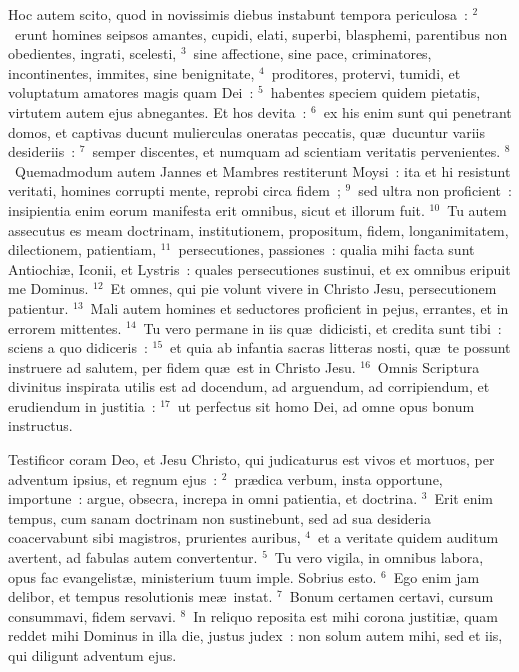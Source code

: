 \lettrine[lines=10,image=true,loversize=0.05,lraise=-0.03]{H}{}oc autem scito, quod in novissimis diebus instabunt tempora periculosa~:
${}^{2}$~erunt homines seipsos amantes, cupidi, elati, superbi, blasphemi, parentibus non obedientes, ingrati, scelesti,
${}^{3}$~sine affectione, sine pace, criminatores, incontinentes, immites, sine benignitate,
${}^{4}$~proditores, protervi, tumidi, et voluptatum amatores magis quam Dei~:
${}^{5}$~habentes speciem quidem pietatis, virtutem autem ejus abnegantes. Et hos devita~:
${}^{6}$~ex his enim sunt qui penetrant domos, et captivas ducunt mulierculas oneratas peccatis, qu\ae\ ducuntur variis desideriis~:
${}^{7}$~semper discentes, et numquam ad scientiam veritatis pervenientes.
${}^{8}$~Quemadmodum autem Jannes et Mambres restiterunt Moysi~: ita et hi resistunt veritati, homines corrupti mente, reprobi circa fidem~;
${}^{9}$~sed ultra non proficient~: insipientia enim eorum manifesta erit omnibus, sicut et illorum fuit.
${}^{10}$~Tu autem assecutus es meam doctrinam, institutionem, propositum, fidem, longanimitatem, dilectionem, patientiam,
${}^{11}$~persecutiones, passiones~: qualia mihi facta sunt Antiochi\ae , Iconii, et Lystris~: quales persecutiones sustinui, et ex omnibus eripuit me Dominus.
${}^{12}$~Et omnes, qui pie volunt vivere in Christo Jesu, persecutionem patientur.
${}^{13}$~Mali autem homines et seductores proficient in pejus, errantes, et in errorem mittentes.
${}^{14}$~Tu vero permane in iis qu\ae\ didicisti, et credita sunt tibi~: sciens a quo didiceris~:
${}^{15}$~et quia ab infantia sacras litteras nosti, qu\ae\ te possunt instruere ad salutem, per fidem qu\ae\ est in Christo Jesu.
${}^{16}$~Omnis Scriptura divinitus inspirata utilis est ad docendum, ad arguendum, ad corripiendum, et erudiendum in justitia~:
${}^{17}$~ut perfectus sit homo Dei, ad omne opus bonum instructus.

\lettrine[lines=10,image=true,loversize=0.05,lraise=-0.03]{T}{}estificor coram Deo, et Jesu Christo, qui judicaturus est vivos et mortuos, per adventum ipsius, et regnum ejus~:
${}^{2}$~pr\ae dica verbum, insta opportune, importune~: argue, obsecra, increpa in omni patientia, et doctrina.
${}^{3}$~Erit enim tempus, cum sanam doctrinam non sustinebunt, sed ad sua desideria coacervabunt sibi magistros, prurientes auribus,
${}^{4}$~et a veritate quidem auditum avertent, ad fabulas autem convertentur.
${}^{5}$~Tu vero vigila, in omnibus labora, opus fac evangelist\ae , ministerium tuum imple. Sobrius esto.
${}^{6}$~Ego enim jam delibor, et tempus resolutionis me\ae\ instat.
${}^{7}$~Bonum certamen certavi, cursum consummavi, fidem servavi.
${}^{8}$~In reliquo reposita est mihi corona justiti\ae , quam reddet mihi Dominus in illa die, justus judex~: non solum autem mihi, sed et iis, qui diligunt adventum ejus.

